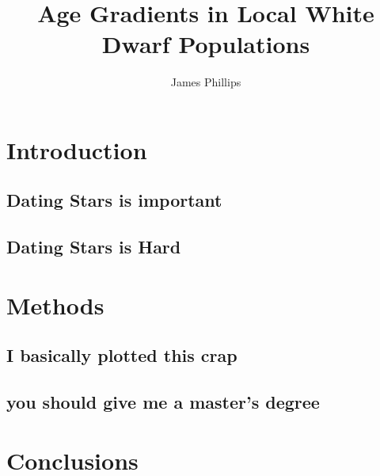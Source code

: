 \documentclass[11pt,letterpaper,draft,titlepage]{article}
\author{James Phillips}
\title{Age Gradients in Local White Dwarf Populations}
\begin{document}
	\pagestyle{empty}

	\tableofcontents
	\newpage
	
	\pagestyle{plain}
	\section{Introduction}
		\subsection{Dating Stars is important}
		
		\subsection{Dating Stars is Hard}
		
	\section{Methods}
		\subsection{I basically plotted this crap}
		\subsection{you should give me a master's degree}
	
	\section{Conclusions}
	
	
	
\end{document}
